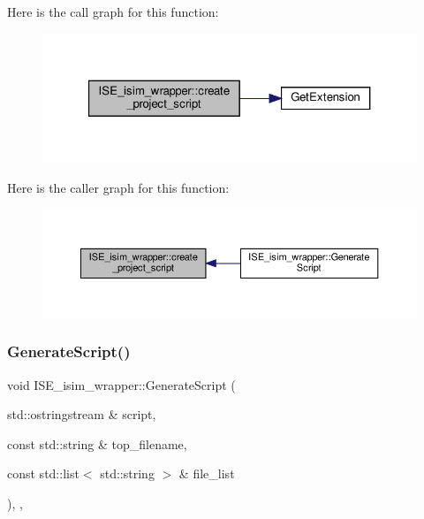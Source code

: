 Here is the call graph for this function\+:
\nopagebreak
\begin{figure}[H]
\begin{center}
\leavevmode
\includegraphics[width=321pt]{d2/d37/classISE__isim__wrapper_a3c70d0ac9c358331df4e9519db77c2f8_cgraph}
\end{center}
\end{figure}
Here is the caller graph for this function\+:
\nopagebreak
\begin{figure}[H]
\begin{center}
\leavevmode
\includegraphics[width=350pt]{d2/d37/classISE__isim__wrapper_a3c70d0ac9c358331df4e9519db77c2f8_icgraph}
\end{center}
\end{figure}
\mbox{\label{classISE__isim__wrapper_a7f67c0aa82f1959d7327f05cb4504477}} 
\subsubsection{\texorpdfstring{Generate\+Script()}{GenerateScript()}}
{\footnotesize\ttfamily void I\+S\+E\+\_\+isim\+\_\+wrapper\+::\+Generate\+Script (\begin{DoxyParamCaption}\item[{std\+::ostringstream \&}]{script,  }\item[{const std\+::string \&}]{top\+\_\+filename,  }\item[{const std\+::list$<$ std\+::string $>$ \&}]{file\+\_\+list }\end{DoxyParamCaption})\hspace{0.3cm}{\ttfamily [override]}, {\ttfamily [private]}, {\ttfamily [virtual]}}



